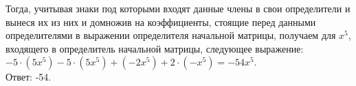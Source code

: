 	    
	    Тогда, учитывая знаки под которыми входят данные члены в свои определители и вынеся их из них и домножив на коэффициенты, стоящие перед данными определителями в выражении определителя начальной матрицы, получаем для $x^5$, входящего в определитель начальной матрицы, следующее выражение:\\
	    $-5 \cdot (5x^5) -5 \cdot (5x^5) + (-2x^5) + 2 \cdot (-x^5) = -54x^5$.\\
	    
	    Ответ: -54.
	
	
